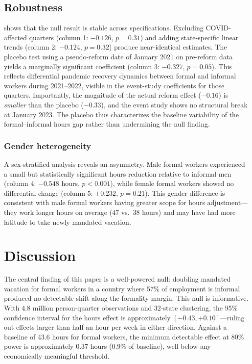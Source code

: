 \documentclass[12pt]{article}
\begin{document}


\subsection{Robustness}

 shows that the null result is stable across specifications. Excluding COVID-affected quarters (column 1: $-0.126$, $p = 0.31$) and adding state-specific linear trends (column 2: $-0.124$, $p = 0.32$) produce near-identical estimates. The placebo test using a pseudo-reform date of January 2021 on pre-reform data yields a marginally significant coefficient (column 3: $-0.327$, $p = 0.05$). This reflects differential pandemic recovery dynamics between formal and informal workers during 2021--2022, visible in the event-study coefficients for those quarters. Importantly, the magnitude of the actual reform effect ($-0.16$) is \textit{smaller} than the placebo ($-0.33$), and the event study shows no structural break at January 2023. The placebo thus characterizes the baseline variability of the formal--informal hours gap rather than undermining the null finding.

\subsubsection*{Gender heterogeneity} A sex-stratified analysis reveals an asymmetry. Male formal workers experienced a small but statistically significant hours reduction relative to informal men (column 4: $-0.548$ hours, $p < 0.001$), while female formal workers showed no differential change (column 5: $+0.232$, $p = 0.21$). This gender difference is consistent with male formal workers having greater scope for hours adjustment---they work longer hours on average (47 vs.\ 38 hours) and may have had more latitude to take newly mandated vacation.



\section{Discussion}

The central finding of this paper is a well-powered null: doubling mandated vacation for formal workers in a country where 57\% of employment is informal produced no detectable shift along the formality margin. This null is informative. With 4.8 million person-quarter observations and 32-state clustering, the 95\% confidence interval for the hours effect is approximately $[-0.43, +0.10]$---ruling out effects larger than half an hour per week in either direction. Against a baseline of 43.6 hours for formal workers, the minimum detectable effect at 80\% power is approximately 0.37 hours (0.9\% of baseline), well below any economically meaningful threshold.
\end{document}
